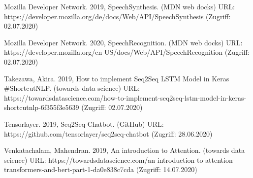 \documentclass{aa}
\begin{document}
\begin{thebibliography}{}
   Mozilla Developer Network. 2019, SpeechSynthesis. (MDN web docks) URL: https://developer.mozilla.org/de/docs/Web/API/SpeechSynthesis (Zugriff: 02.07.2020) 
  
   Mozilla Developer Network. 2020, SpeechRecognition. (MDN web docks) URL: https://developer.mozilla.org/en-US/docs/Web/API/SpeechRecognition (Zugriff: 02.07.2020)
  
   Takezawa, Akira. 2019, How to implement Seq2Seq LSTM Model in Keras #ShortcutNLP. (towards data science) URL: https://towardsdatascience.com/how-to-implement-seq2seq-lstm-model-in-keras-shortcutnlp-6f355f3e5639 (Zugriff: 02.07.2020)

   Tensorlayer. 2019, Seq2Seq Chatbot. (GitHub) URL: https://github.com/tensorlayer/seq2seq-chatbot (Zugriff: 28.06.2020)
  
   Venkatachalam, Mahendran. 2019, An introduction to Attention. (towards data science) URL: https://towardsdatascience.com/an-introduction-to-attention-transformers-and-bert-part-1-da0e838c7cda (Zugriff: 14.07.2020)

\end{thebibliography}
\end{document}

